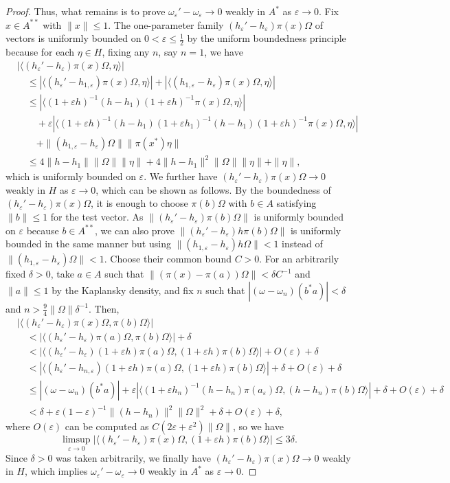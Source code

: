 \documentclass[a4paper]{amsart}
\newcommand{\e}{\varepsilon}
\theoremstyle{plain}
\theoremstyle{definition}
\begin{document}
\begin{proof}
Thus, what remains is to prove $\omega_\e'-\omega_\e\to0$ weakly in $A^*$ as $\e\to0$.
Fix $x\in A^{**}$ with $\|x\|\le1$.
The one-parameter family $(h_\e'-h_\e)\pi(x)\Omega$ of vectors is uniformly bounded on $0<\e\le\frac12$ by the uniform boundedness principle because for each $\eta\in H$, fixing any $n$, say $n=1$, we have
\begin{align*}
&|\langle(h_\e'-h_\e)\pi(x)\Omega,\eta\rangle|\\
&\quad\le|\langle(h_\e'-h_{1,\e})\pi(x)\Omega,\eta\rangle|+|\langle(h_{1,\e}-h_\e)\pi(x)\Omega,\eta\rangle|\\
&\quad\le|\langle(1+\e h)^{-1}(h-h_1)(1+\e h)^{-1}\pi(x)\Omega,\eta\rangle|\\
&\qquad+\e|\langle(1+\e h)^{-1}(h-h_1)(1+\e h_1)^{-1}(h-h_1)(1+\e h)^{-1}\pi(x)\Omega,\eta\rangle|\\
&\qquad+\|(h_{1,\e}-h_\e)\Omega\|\|\pi(x^*)\eta\|\\
&\quad\le4\|h-h_1\|\|\Omega\|\|\eta\|+4\|h-h_1\|^2\|\Omega\|\|\eta\|+\|\eta\|,
\end{align*}
which is uniformly bounded on $\e$.
We further have $(h_\e'-h_\e)\pi(x)\Omega\to0$ weakly in $H$ as $\e\to0$, which can be shown as follows.
By the boundedness of $(h_\e'-h_\e)\pi(x)\Omega$, it is enough to choose $\pi(b)\Omega$ with $b\in A$ satisfying $\|b\|\le1$ for the test vector. 
As $\|(h_\e'-h_\e)\pi(b)\Omega\|$ is uniformly bounded on $\e$ because $b\in A^{**}$, we can also prove $\|(h_\e'-h_\e)h\pi(b)\Omega\|$ is uniformly bounded in the same manner but using $\|(h_{1,\e}-h_\e)h\Omega\|<1$ instead of $\|(h_{1,\e}-h_\e)\Omega\|<1$. 
Choose their common bound $C>0$.
For an arbitrarily fixed $\delta>0$, take $a\in A$ such that $\|(\pi(x)-\pi(a))\Omega\|<\delta C^{-1}$ and $\|a\|\le1$ by the Kaplansky density, and fix $n$ such that $|(\omega-\omega_n)(b^*a)|<\delta$ and $n>\frac94\|\Omega\|\delta^{-1}$.
Then,
\begin{align*}
&|\langle(h_\e'-h_\e)\pi(x)\Omega,\pi(b)\Omega\rangle|\\
&\quad<|\langle(h_\e'-h_\e)\pi(a)\Omega,\pi(b)\Omega\rangle|+\delta\\
&\quad<|\langle(h_\e'-h_\e)(1+\e h)\pi(a)\Omega,(1+\e h)\pi(b)\Omega\rangle|+O(\e)+\delta\\
&\quad<|\langle(h_\e'-h_{n,\e})(1+\e h)\pi(a)\Omega,(1+\e h)\pi(b)\Omega\rangle|+\delta+O(\e)+\delta\\
&\quad\le|(\omega-\omega_n)(b^*a)|+\e|\langle(1+\e h_n)^{-1}(h-h_n)\pi(a_\e)\Omega,(h-h_n)\pi(b)\Omega\rangle|+\delta+O(\e)+\delta\\
&\quad<\delta+\e(1-\e)^{-1}\|(h-h_n)\|^2\|\Omega\|^2+\delta+O(\e)+\delta,
\end{align*}
where $O(\e)$ can be computed as $C(2\e+\e^2)\|\Omega\|$, so we have
\[\limsup_{\e\to0}|\langle(h_\e'-h_\e)\pi(x)\Omega,(1+\e h)\pi(b)\Omega\rangle|\le3\delta.\]
Since $\delta>0$ was taken arbitrarily, we finally have $(h_\e'-h_\e)\pi(x)\Omega\to0$ weakly in $H$, which implies $\omega_\e'-\omega_\e\to0$ weakly in $A^*$ as $\e\to0$.
\end{proof}
\end{document}
